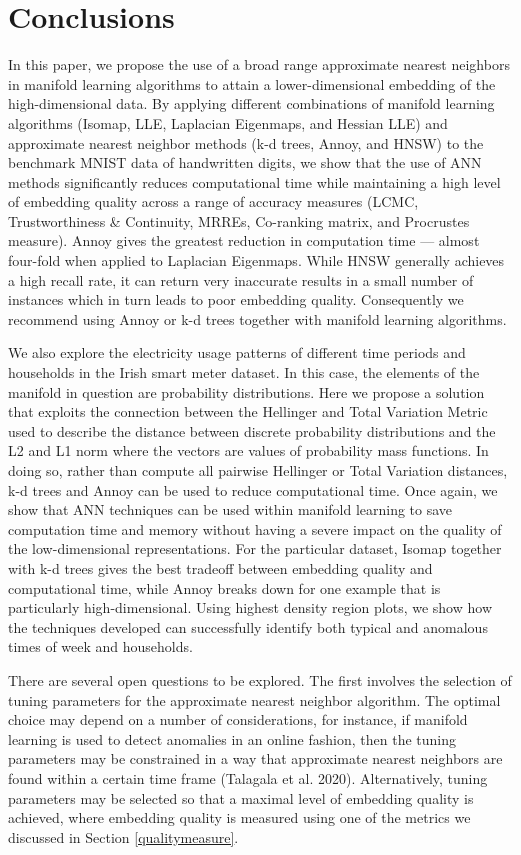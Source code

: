 \documentclass[12pt]{article}
\begin{document}
\hypertarget{conclusion}{%
\section{Conclusions}\label{conclusion}}

In this paper, we propose the use of a broad range approximate nearest neighbors in manifold learning algorithms to attain a lower-dimensional embedding of the high-dimensional data. By applying different combinations of manifold learning algorithms (Isomap, LLE, Laplacian Eigenmaps, and Hessian LLE) and approximate nearest neighbor methods (k-d trees, Annoy, and HNSW) to the benchmark MNIST data of handwritten digits, we show that the use of ANN methods significantly reduces computational time while maintaining a high level of embedding quality across a range of accuracy measures (LCMC, Trustworthiness \& Continuity, MRREs, Co-ranking matrix, and Procrustes measure). Annoy gives the greatest reduction in computation time --- almost four-fold when applied to Laplacian Eigenmaps. While HNSW generally achieves a high recall rate, it can return very inaccurate results in a small number of instances which in turn leads to poor embedding quality. Consequently we recommend using Annoy or k-d trees together with manifold learning algorithms.

We also explore the electricity usage patterns of different time periods and households in the Irish smart meter dataset. In this case, the elements of the manifold in question are probability distributions. Here we propose a solution that exploits the connection between the Hellinger and Total Variation Metric used to describe the distance between discrete probability distributions and the L2 and L1 norm where the vectors are values of probability mass functions. In doing so, rather than compute all pairwise Hellinger or Total Variation distances, k-d trees and Annoy can be used to reduce computational time.
Once again, we show that ANN techniques can be used within manifold learning to save computation time and memory without having a severe impact on the quality of the low-dimensional representations. For the particular dataset, Isomap together with k-d trees gives the best tradeoff between embedding quality and computational time, while Annoy breaks down for one example that is particularly high-dimensional. Using highest density region plots, we show how the techniques developed can successfully identify both typical and anomalous times of week and households.

There are several open questions to be explored. The first involves the selection of tuning parameters for the approximate nearest neighbor algorithm. The optimal choice may depend on a number of considerations, for instance, if manifold learning is used to detect anomalies in an online fashion, then the tuning parameters may be constrained in a way that approximate nearest neighbors are found within a certain time frame (Talagala et al. 2020). Alternatively, tuning parameters may be selected so that a maximal level of embedding quality is achieved, where embedding quality is measured using one of the metrics we discussed in Section \ref{qualitymeasure}.
\end{document}
